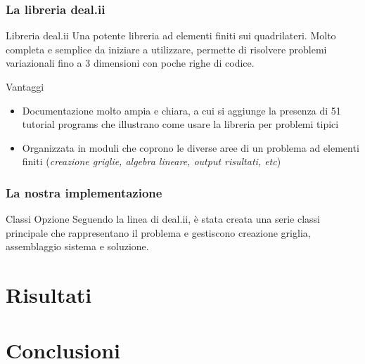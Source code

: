 \documentclass{beamer}
\begin{document}
\begin{frame}
\frametitle{La libreria \textsf{deal.ii}}
\begin{block}{Libreria \textsf{deal.ii}}
Una potente libreria ad elementi finiti sui quadrilateri. Molto completa e semplice da iniziare a utilizzare, permette di risolvere problemi variazionali fino a 3 dimensioni con poche righe di codice. 
\end{block}

\pause
\begin{block}{Vantaggi}
 \begin{itemize}
  \item Documentazione molto ampia e chiara, a cui si aggiunge la presenza di 51 tutorial programs che illustrano come usare la libreria per problemi tipici
  \item Organizzata in moduli che coprono le diverse aree di un problema ad elementi finiti (\emph{creazione griglie, algebra lineare, output risultati, etc})
 \end{itemize}
\end{block}
\end{frame}

\begin{frame}
 \frametitle{La nostra implementazione }
 \begin{block}{Classi Opzione}
 Seguendo la linea di \textsf{deal.ii}, è stata creata una serie classi principale che rappresentano il problema e gestiscono creazione griglia, assemblaggio sistema e soluzione.
 \end{block}
\end{frame}


\section{Risultati}

\section{Conclusioni}
\end{document}
